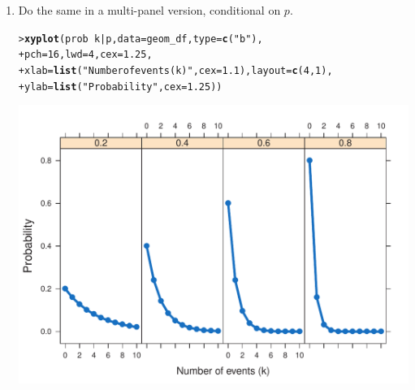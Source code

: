 \documentclass[10pt]{report}\usepackage[]{graphicx}\usepackage[]{color}
\makeatletter
\newcommand{\hlnum}[1]{\textcolor[rgb]{0.686,0.059,0.569}{#1}}%
\newcommand{\hlstr}[1]{\textcolor[rgb]{0.192,0.494,0.8}{#1}}%
\newcommand{\hlopt}[1]{\textcolor[rgb]{0,0,0}{#1}}%
\newcommand{\hlstd}[1]{\textcolor[rgb]{0.345,0.345,0.345}{#1}}%
\newcommand{\hlkwc}[1]{\textcolor[rgb]{0.333,0.667,0.333}{#1}}%
\newcommand{\hlkwd}[1]{\textcolor[rgb]{0.737,0.353,0.396}{\textbf{#1}}}%
\newenvironment{kframe}{%
 \def\at@end@of@kframe{}%
 \ifinner\ifhmode%
  \def\at@end@of@kframe{\end{minipage}}%
  \begin{minipage}{\columnwidth}%
 \fi\fi%
 \def\FrameCommand##1{\hskip\@totalleftmargin \hskip-\fboxsep
 \colorbox{shadecolor}{##1}\hskip-\fboxsep
     \hskip-\linewidth \hskip-\@totalleftmargin \hskip\columnwidth}%
 \MakeFramed {\advance\hsize-\width
   \@totalleftmargin\z@ \linewidth\hsize
   \@setminipage}}%
 {\par\unskip\endMakeFramed%
 \at@end@of@kframe}
\newenvironment{knitrout}{}{} %
\renewenvironment{knitrout}{\small\renewcommand{\baselinestretch}{.85}}{} %
\makeatother
\begin{document}
\begin{Exercises}
\begin{enumerate}
    \item Do the same in a multi-panel version, conditional on $p$.
    \begin{ans}
\begin{knitrout}\footnotesize
{}\color{fgcolor}\begin{kframe}
\begin{alltt}
\hlstd{> }\hlkwd{xyplot}\hlstd{(prob} \hlopt{~} \hlstd{k} \hlopt{|} \hlstd{p ,} \hlkwc{data} \hlstd{= geom_df,} \hlkwc{type} \hlstd{=} \hlkwd{c}\hlstd{(}\hlstr{"b"}\hlstd{),}
\hlstd{+ }       \hlkwc{pch} \hlstd{=} \hlnum{16}\hlstd{,} \hlkwc{lwd} \hlstd{=} \hlnum{4}\hlstd{,} \hlkwc{cex} \hlstd{=} \hlnum{1.25}\hlstd{,}
\hlstd{+ }       \hlkwc{xlab} \hlstd{=} \hlkwd{list}\hlstd{(}\hlstr{"Number of events (k)"}\hlstd{,} \hlkwc{cex} \hlstd{=} \hlnum{1.1}\hlstd{),} \hlkwc{layout} \hlstd{=} \hlkwd{c}\hlstd{(}\hlnum{4}\hlstd{,}\hlnum{1}\hlstd{),}
\hlstd{+ }       \hlkwc{ylab} \hlstd{=} \hlkwd{list}\hlstd{(}\hlstr{"Probability"}\hlstd{,} \hlkwc{cex} \hlstd{=} \hlnum{1.25}\hlstd{))}
\end{alltt}
\end{kframe}

\centerline{\includegraphics[width=.75\textwidth]{soln/fig/ex3_2c-1} }



\end{knitrout}
    \end{ans}
    
  \end{enumerate}


\end{Exercises}
\end{document}
